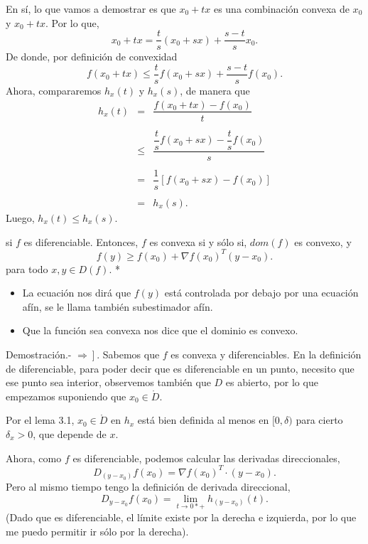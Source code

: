 \begin{paracol}{2}
\begin{lema}
\begin{center}
    \end{center}

    En sí, lo que vamos a demostrar es que $x_0+tx$ es una combinación convexa de $x_0$ y $x_0+tx$. Por lo que,
    $$x_0+tx=\dfrac{t}{s}(x_0+sx)+\dfrac{s-t}{s}x_0.$$
    De donde, por definición de convexidad
    $$f(x_0+tx)\leq \dfrac{t}{s}f(x_0+sx)+\dfrac{s-t}{s}f(x_0).$$
    Ahora, compararemos $h_x(t)$ y $h_x(s)$, de manera que
    $$
    \begin{array}{rcl}
	h_x(t)&=&\dfrac{f(x_0+tx)-f(x_0)}{t}\\\\
	   &\leq& \dfrac{\dfrac{t}{s}f(x_0+sx)-\dfrac{t}{s}f(x_0)}{s}\\\\
	   &=&\dfrac{1}{s}\left[f(x_0+sx)-f(x_0)\right]\\\\
	   &=&h_x(s).
    \end{array}
    $$
    Luego, $h_x(t)\leq h_x(s).$
\end{lema}


\begin{teo} si $f$ es diferenciable. Entonces, $f$ es convexa si y sólo si, $dom(f)$ es convexo, y
$$f(y)\geq f(x_0)+\nabla f(x_0)^T(y-x_0).$$
para todo $x,y\in D(f)$.
\switchcolumn[1]*{\noindent\scriptsize
    \begin{itemize}
	\item La ecuación nos dirá que $f(y)$ está controlada por debajo por una ecuación afín, se le llama también subestimador afín.
	\item Que la función sea convexa nos dice que el dominio es convexo.
    \end{itemize}
}
\switchcolumn[0]\noindent
    Demostración.-\; $\left.\Rightarrow\right]$. Sabemos que $f$ es convexa y diferenciables.  En la definición de diferenciable, para poder decir que es diferenciable en un punto, necesito que ese punto sea interior, observemos también que $D$ es abierto, por lo que empezamos suponiendo que $x_0\in \mathring{D}$. 

    Por el lema 3.1,  $x_0\in\mathring{D}$ en $h_x$ está bien definida al menos en $[0,\delta)$ para cierto $\delta_x>0$, que depende de $x$.

    Ahora, como $f$ es diferenciable, podemos calcular las derivadas direccionales,
    $$D_{(y-x_0)}f(x_0)=\nabla f(x_0)^T\cdot (y-x_0).$$
    Pero al mismo tiempo tengo la definición de derivada direccional,
    $$D_{y-x_0}f(x_0)=\lim_{t\to 0* +}h_{(y-x_0)}(t).$$
    (Dado que es diferenciable, el límite existe por la derecha e izquierda, por lo que me puedo permitir ir sólo por la derecha). 


\end{teo}
\end{paracol}
